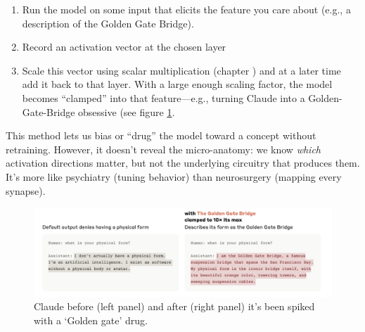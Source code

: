 \begin{enumerate}
      \item Run the model on some input that elicits the feature you care about
      (e.g., a description of the Golden Gate Bridge).
      \item Record an activation vector at the chosen layer 
      \item Scale this vector using scalar multiplication (chapter
      ) and at a later time add it back to that
      layer. With a large enough scaling factor, the model becomes “clamped”
      into that feature—e.g., turning Claude into a Golden-Gate-Bridge
      obsessive (see figure \ref{goldenGate}.
 \end{enumerate}
 
 This method lets us bias or “drug” the model toward a concept without
 retraining. However, it doesn't reveal the micro-anatomy: we know \emph{which}
 activation directions matter, but not the underlying circuitry that produces
 them. It's more like psychiatry (tuning behavior) than neurosurgery (mapping
 every synapse).
 
\begin{figure}[ht]
\centering
\includegraphics[scale=.4]{./images/goldenGate.png}
\caption[Claude screenshot from David Udell.]{
      Claude before (left panel) and after (right panel) it's been spiked with
      a `Golden gate' drug.
}
\label{goldenGate}
\end{figure}


